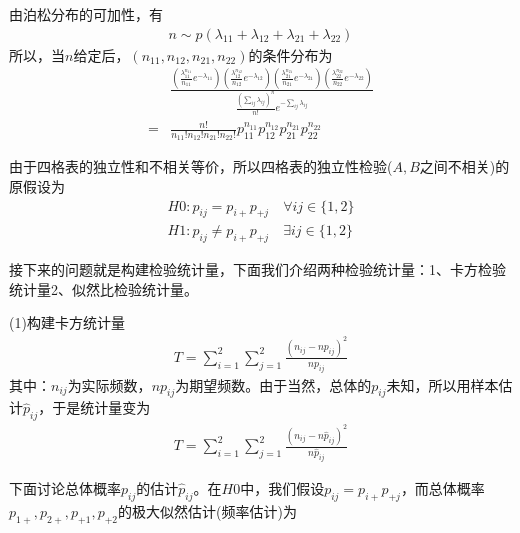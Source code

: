             \begin{Proof}
            由泊松分布的可加性，有
            \begin{align*}
            n\sim p(\lambda_{11}+\lambda_{12}+\lambda_{21}+\lambda_{22})
            \end{align*}
            所以，当$n$给定后，$(n_{11},n_{12},n_{21},n_{22})$的条件分布为
            \begin{align*}
            &\frac{\left( \frac{\lambda_{11}^{n_{11}}}{n_{11}} e^{-\lambda_{11}} \right)
            \left( \frac{\lambda_{12}^{n_{12}}}{n_{12}} e^{-\lambda_{12}} \right)
            \left( \frac{\lambda_{21}^{n_{21}}}{n_{21}} e^{-\lambda_{21}} \right)
            \left( \frac{\lambda_{22}^{n_{22}}}{n_{22}} e^{-\lambda_{22}} \right)}{\frac{(\sum_{ij}\lambda_{ij})^n}{n!}e^{-\sum_{ij}\lambda_{ij}}}\\
            ={}&\frac{n!}{n_{11}!n_{12}!n_{21}!n_{22}!}p_{11}^{n_{11}}p_{12}^{n_{12}}p_{21}^{n_{21}}p_{22}^{n_{22}}
            \end{align*}
            \end{Proof}
            \par
            由于四格表的独立性和不相关等价，所以四格表的独立性检验($A,B$之间不相关)的原假设为
            \begin{align*}
            H0:p_{ij} = p_{i+}p_{+j}\quad \forall ij\in \{1,2\}\\
            H1:p_{ij} \neq p_{i+}p_{+j}\quad \exists ij\in \{1,2\}
            \end{align*}
            \par
            接下来的问题就是构建检验统计量，下面我们介绍两种检验统计量：1、卡方检验统计量2、似然比检验统计量。
            \par
            (1)构建卡方统计量
            \begin{align*}
            T =\sum_{i=1}^2\sum_{j=1}^2\frac{(n_{ij} - n{p}_{ij})^2}{n{p}_{ij}}
            \end{align*}
            其中：$n_{ij}$为实际频数，$n{p}_{ij}$为期望频数。由于当然，总体的$p_{ij}$未知，所以用样本估计$\hat{p}_{ij}$，于是统计量变为
            \begin{align*}
            T =\sum_{i=1}^2\sum_{j=1}^2\frac{(n_{ij} - n\hat{p}_{ij})^2}{n\hat{p}_{ij}}
            \end{align*}
            \par
            下面讨论总体概率$p_{ij}$的估计$\hat{p}_{ij}$。在$H0$中，我们假设$p_{ij} = p_{i+}p_{+j}$，而总体概率$p_{1+},p_{2+},p_{+1},p_{+2}$的极大似然估计(频率估计)为
